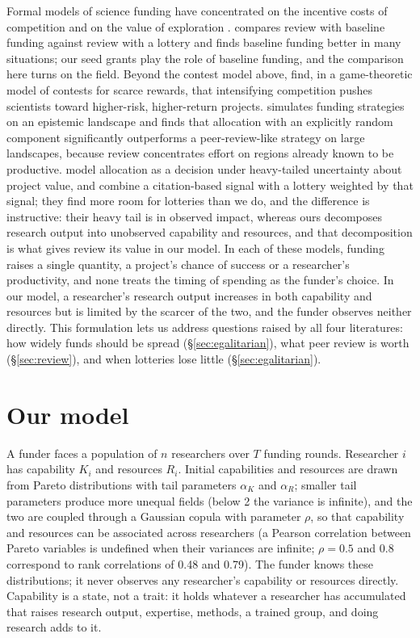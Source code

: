 \documentclass[article, 11pt, reqno]{amsart}
\theoremstyle{named}
\begin{document}
Formal models of science funding have concentrated on the incentive costs of competition and on the value of exploration \citep{WeisbergMuldoon2009}. \citet{Sakamoto2023} compares review with baseline funding against review with a lottery and finds baseline funding better in many situations; our seed grants play the role of baseline funding, and the comparison here turns on the field. Beyond the contest model above, \citet{GrossBergstrom2025} find, in a game-theoretic model of contests for scarce rewards, that intensifying competition pushes scientists toward higher-risk, higher-return projects. \citet{AvinBJPS2019} simulates funding strategies on an epistemic landscape and finds that allocation with an explicitly random component significantly outperforms a peer-review-like strategy on large landscapes, because review concentrates effort on regions already known to be productive. \citet{Sorzano2026} model allocation as a decision under heavy-tailed uncertainty about project value, and combine a citation-based signal with a lottery weighted by that signal; they find more room for lotteries than we do, and the difference is instructive: their heavy tail is in observed impact, whereas ours decomposes research output into unobserved capability and resources, and that decomposition is what gives review its value in our model. In each of these models, funding raises a single quantity, a project's chance of success or a researcher's productivity, and none treats the timing of spending as the funder's choice. In our model, a researcher's research output increases in both capability and resources but is limited by the scarcer of the two, and the funder observes neither directly. This formulation lets us address questions raised by all four literatures: how widely funds should be spread (\S\ref{sec:egalitarian}), what peer review is worth (\S\ref{sec:review}), and when lotteries lose little (\S\ref{sec:egalitarian}).

\section{Our model}\label{sec:model}

A funder faces a population of $n$ researchers over $T$ funding rounds. Researcher $i$ has capability $K_i$ and resources $R_i$. Initial capabilities and resources are drawn from Pareto distributions with tail parameters $\alpha_K$ and $\alpha_R$; smaller tail parameters produce more unequal fields (below 2 the variance is infinite), and the two are coupled through a Gaussian copula with parameter $\rho$, so that capability and resources can be associated across researchers (a Pearson correlation between Pareto variables is undefined when their variances are infinite; $\rho = 0.5$ and $0.8$ correspond to rank correlations of 0.48 and 0.79). The funder knows these distributions; it never observes any researcher's capability or resources directly. Capability is a state, not a trait: it holds whatever a researcher has accumulated that raises research output, expertise, methods, a trained group, and doing research adds to it.
\end{document}
